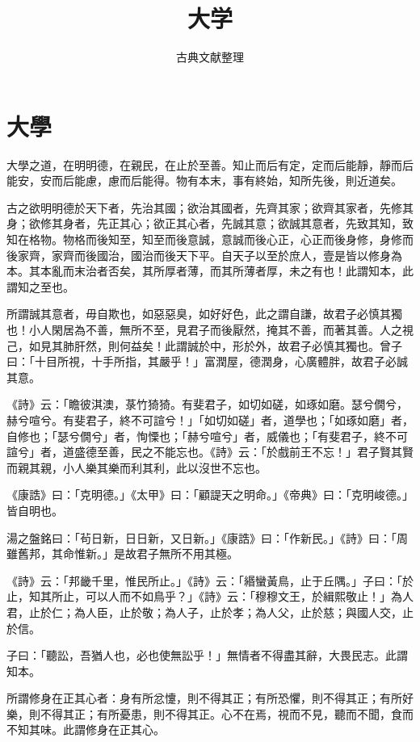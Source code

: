 \documentclass[12pt,a4paper]{ctexbook}
\title{大学}
\author{古典文献整理}
\date{}
\begin{document}
\maketitle
\tableofcontents
\newpage
\section{大學}
大學之道，在明明德，在親民，在止於至善。知止而后有定，定而后能靜，靜而后能安，安而后能慮，慮而后能得。物有本末，事有終始，知所先後，則近道矣。\par
古之欲明明德於天下者，先治其國；欲治其國者，先齊其家；欲齊其家者，先修其身；欲修其身者，先正其心；欲正其心者，先誠其意；欲誠其意者，先致其知，致知在格物。物格而後知至，知至而後意誠，意誠而後心正，心正而後身修，身修而後家齊，家齊而後國治，國治而後天下平。自天子以至於庶人，壹是皆以修身為本。其本亂而末治者否矣，其所厚者薄，而其所薄者厚，未之有也！此謂知本，此謂知之至也。\par
所謂誠其意者，毋自欺也，如惡惡臭，如好好色，此之謂自謙，故君子必慎其獨也！小人閑居為不善，無所不至，見君子而後厭然，掩其不善，而著其善。人之視己，如見其肺肝然，則何益矣！此謂誠於中，形於外，故君子必慎其獨也。曾子曰：「十目所視，十手所指，其嚴乎！」富潤屋，德潤身，心廣體胖，故君子必誠其意。\par
《詩》云：「瞻彼淇澳，菉竹猗猗。有斐君子，如切如磋，如琢如磨。瑟兮僩兮，赫兮喧兮。有斐君子，終不可諠兮！」「如切如磋」者，道學也；「如琢如磨」者，自修也；「瑟兮僩兮」者，恂慄也；「赫兮喧兮」者，威儀也；「有斐君子，終不可諠兮」者，道盛德至善，民之不能忘也。《詩》云：「於戲前王不忘！」君子賢其賢而親其親，小人樂其樂而利其利，此以沒世不忘也。\par
《康誥》曰：「克明德。」《太甲》曰：「顧諟天之明命。」《帝典》曰：「克明峻德。」皆自明也。\par
湯之盤銘曰：「茍日新，日日新，又日新。」《康誥》曰：「作新民。」《詩》曰：「周雖舊邦，其命惟新。」是故君子無所不用其極。\par
《詩》云：「邦畿千里，惟民所止。」《詩》云：「緡蠻黃鳥，止于丘隅。」子曰：「於止，知其所止，可以人而不如鳥乎？」《詩》云：「穆穆文王，於緝熙敬止！」為人君，止於仁；為人臣，止於敬；為人子，止於孝；為人父，止於慈；與國人交，止於信。\par
子曰：「聽訟，吾猶人也，必也使無訟乎！」無情者不得盡其辭，大畏民志。此謂知本。\par
所謂修身在正其心者：身有所忿懥，則不得其正；有所恐懼，則不得其正；有所好樂，則不得其正；有所憂患，則不得其正。心不在焉，視而不見，聽而不聞，食而不知其味。此謂修身在正其心。\par
\end{document}
